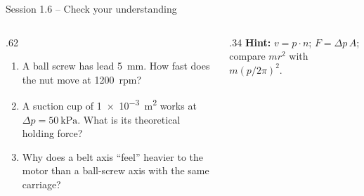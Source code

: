 \documentclass[aspectratio=169,10pt]{beamer}
\begin{document}
\begin{frame}{Session 1.6 -- Check your understanding}
\begin{columns}[T]
\begin{column}{.62\textwidth}
\begin{keybox}
\begin{enumerate}\setlength\itemsep{6pt}
\item A ball screw has lead \SI{5}{\milli\metre}. How fast does the nut move at \SI{1200}{rpm}?
\item A suction cup of \SI{1e-3}{\metre\squared} works at $\Delta p=\SI{50}{\kilo\pascal}$. What is its theoretical holding force?
\item Why does a belt axis ``feel'' heavier to the motor than a ball-screw axis with the same carriage?
\end{enumerate}
\end{keybox}
\end{column}
\begin{column}{.34\textwidth}
\small
\textbf{Hint:} $v=p\cdot n$; $F=\Delta p\,A$; compare $m r^2$ with $m(p/2\pi)^2$.
\end{column}
\end{columns}
\end{frame}
\end{document}
